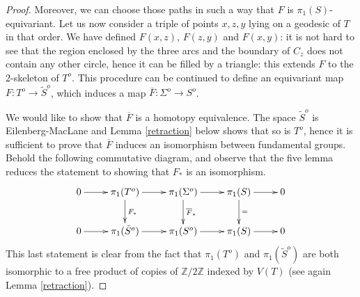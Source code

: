 \documentclass{amsart}
\newcommand{\Z}{\mathbb{Z}}
\renewcommand{\H}{\mathbb{H}}
\begin{document}
\begin{proof}
%
%

Moreover, we can choose those paths in such a way that $F$ is $\pi_1(S)$-equivariant. Let us now consider a triple of points $x,z,y$ lying on a geodesic of $T$ in that order. We have defined $F(x,z)$, $F(z,y)$ and $F(x,y)$: it is not hard to see that the region enclosed by the three arcs and the boundary of $C_z$ does not contain any other circle, hence it can be filled by a triangle: this extends $F$ to the $2$-skeleton of $T^o$. 
%
This procedure can be continued to define an equivariant map $F:T^o\to \tilde{S}^o$, which induces a map $\overline{F}:\Sigma^o\to S^o$.

We would like to show that $\overline{F}$ is a homotopy equivalence. The space $\tilde{S}^o$ is Eilenberg-MacLane and Lemma \ref{retraction} below shows that so is $T^o$, hence it is sufficient to prove that $\overline{F}$ induces an isomorphism between fundamental groups.
%
Behold the following commutative diagram, and observe that the five lemma reduces the statement to showing that $F_*$ is an isomorphism.
$$\xymatrix{
0\ar[r]& \pi_1(T^o)\ar[d]^{F_*}\ar[r] & \pi_1(\Sigma^o)\ar[r]\ar[d]^{\overline{F}_*}& \pi_1(S)\ar[d]^=\ar[r]& 0 \\
0\ar[r]& \pi_1(\tilde{S}^o)\ar[r] & \pi_1(S^o)\ar[r]& \pi_1(S)\ar[r]& 0 
}$$
This last statement is clear from the fact that $\pi_1(T^o)$ and $\pi_1(\tilde{S}^o)$ are both isomorphic to a free product of copies of $\Z/2\Z$ indexed by $V(T)$ (see again Lemma \ref{retraction}). 
\end{proof}
\end{document}
